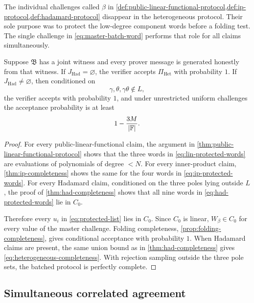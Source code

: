The individual challenges called $\beta$ in \cref{def:public-linear-functional-protocol,def:ip-protocol,def:hadamard-protocol} disappear in the heterogeneous protocol.  Their sole purpose was to protect the low-degree component words before a folding test.  The single challenge in \eqref{eq:master-batch-word} performs that role for all claims simultaneously.

\begin{theorem}[Completeness]
\label{thm:heterogeneous-completeness}
Suppose $\mathfrak B$ has a joint witness and every prover message is generated honestly from that witness.  If $J_{\mathrm{Had}}=\varnothing$, the verifier accepts $\Pi_{\mathrm{Het}}$ with probability $1$.  If $J_{\mathrm{Had}}\ne\varnothing$, then conditioned on
\[
  \gamma,\theta,\gamma\theta\notin L,
\]
the verifier accepts with probability $1$, and under unrestricted uniform challenges the acceptance probability is at least
\begin{equation}
  1-\frac{3M}{|\mathbb{F}|}.
  \label{eq:heterogeneous-completeness}
\end{equation}
\end{theorem}

\begin{proof}
For every public-linear-functional claim, the argument in \cref{thm:public-linear-functional-protocol} shows that the three words in \eqref{eq:lin-protected-words} are evaluations of polynomials of degree $<N$.  For every inner-product claim, \cref{thm:ip-completeness} shows the same for the four words in \eqref{eq:ip-protected-words}.  For every Hadamard claim, conditioned on the three poles lying outside $L$, the proof of \cref{thm:had-completeness} shows that all nine words in \eqref{eq:had-protected-words} lie in $C_0$.

Therefore every $u_i$ in \eqref{eq:protected-list} lies in $C_0$.  Since $C_0$ is linear, $W_\beta\in C_0$ for every value of the master challenge.  Folding completeness, \cref{prop:folding-completeness}, gives conditional acceptance with probability $1$.  When Hadamard claims are present, the same union bound as in \cref{thm:had-completeness} gives \eqref{eq:heterogeneous-completeness}.  With rejection sampling outside the three pole sets, the batched protocol is perfectly complete.
\end{proof}

\subsection{Simultaneous correlated agreement}
\label{sec:simultaneous-correlated-agreement}

